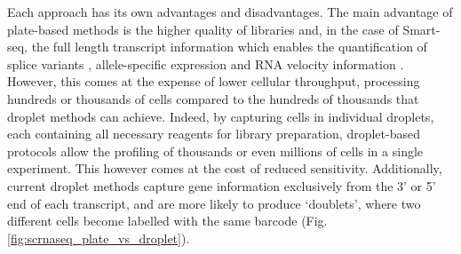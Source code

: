 Each approach has its own advantages and disadvantages.
The main advantage of plate-based methods is the higher quality of libraries and, in the case of Smart-seq, the full length transcript information which enables the quantification of splice variants \cite{westoby2018simulation}, allele-specific expression \cite{jiang2017scale} and RNA velocity information \cite{la2018rna}. 
However, this comes at the expense of lower cellular throughput, processing hundreds or thousands of cells compared to the hundreds of thousands that droplet methods can achieve.
Indeed, by capturing cells in individual droplets, 
each containing all necessary reagents for library preparation, 
droplet-based protocols allow the profiling of thousands or even millions of cells in a single experiment. 
This however comes at the cost of reduced sensitivity.
Additionally, current droplet methods capture gene information exclusively from the 3’ or 5’ end of each transcript, and are more likely to produce `doublets', where two different cells become labelled with the same barcode (Fig. \ref{fig:scrnaseq_plate_vs_droplet}). 
\\

